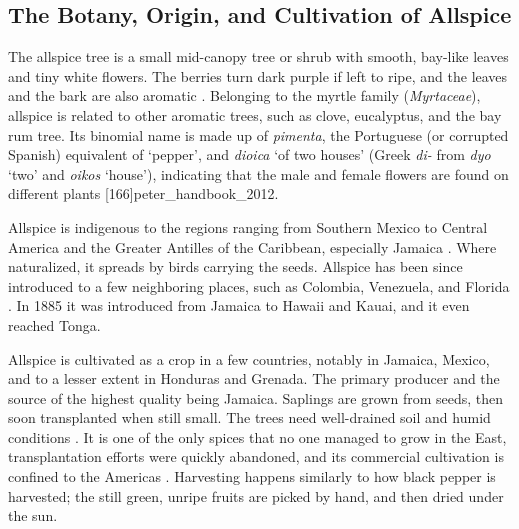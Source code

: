 \subsection{The Botany, Origin, and  Cultivation of Allspice}

The allspice tree is a small mid-canopy tree or shrub with smooth, bay-like leaves and tiny white flowers. The berries turn dark purple if left to ripe, and the leaves and the bark are also aromatic \autocite[279]{riffle_tropical_1998}. Belonging to the myrtle family (\textit{Myrtaceae}), allspice is related to other aromatic trees, such as clove, eucalyptus, and the bay rum tree. Its binomial name is made up of \textit{pimenta}, the Portuguese (or corrupted Spanish) equivalent of `pepper', and \textit{dioica} `of two houses' (Greek \textit{di-} from \textit{dyo} `two' and \textit{oikos} `house'), indicating that the male and female flowers are found on different plants [166]{peter_handbook_2012}.

Allspice is indigenous to the regions ranging from Southern Mexico to Central America and the Greater Antilles of the Caribbean, especially Jamaica \autocite[146]{czarra_spices_2009}. Where naturalized, it spreads by birds carrying the seeds. Allspice has been since introduced to a few neighboring places, such as Colombia, Venezuela, and Florida \autocite[][146]{powo_pimenta_2022}. In 1885 it was introduced from Jamaica to Hawaii and Kauai, 
and it even reached Tonga.

Allspice is cultivated as a crop in a few countries, notably in Jamaica, Mexico, and to a lesser extent in Honduras and Grenada. The primary producer and the source of the highest quality being Jamaica. Saplings are grown from seeds, then soon transplanted when still small. The trees need well-drained soil and humid conditions \autocite[210]{van_wyk_culinary_2014}. It is one of the only spices that no one managed to grow in the East, transplantation efforts were quickly abandoned, and its commercial cultivation is confined to the Americas \autocite[21]{duke_crc_2002}. 
Harvesting happens similarly to how black pepper is harvested; the still green, unripe fruits are picked by hand, and then dried under the sun.

